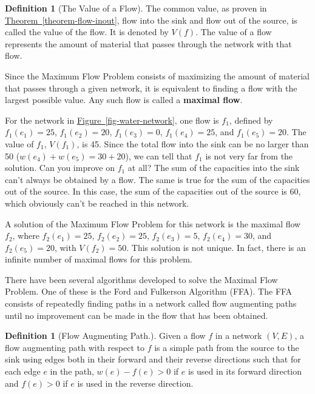 \documentclass[10pt,]{book}
\newcommand{\terminology}[1]{\textbf{#1}}
\theoremstyle{plain}
\theoremstyle{definition}
\newtheorem{definition}[theorem]{Definition}
\theoremstyle{definition}
\theoremstyle{definition}
\theoremstyle{definition}
\theoremstyle{definition}
\numberwithin{equation}{section}
\begin{document}
\begin{definition}[The Value of a Flow]\label{def-value-of-flow}
\label{notation-5}
The common value, as proven in \hyperref[theorem-flow-inout]{Theorem~\ref{theorem-flow-inout}}, flow into the sink and flow out of the source, is called the value of the flow. It is denoted by \(V(f)\). The value of a flow represents the amount of material that passes through the network with that flow.%
\end{definition}
\par
Since the Maximum Flow Problem consists of maximizing the amount of material that passes through a given network, it is equivalent to finding a flow with the largest possible value. Any such flow is called a \terminology{maximal flow}.%
\par
For the network in \hyperref[fig-water-network]{Figure~\ref{fig-water-network}}, one flow is \(f_1\), defined by \(f_1\left(e_1\right)=25\), \(f_1\left(e_2\right)=20\), \(f_1\left(e_3\right)=0\),
\(f_1\left(e_4\right)= 25\), and \(f_1\left(e_5\right)=20\). The value of \(f_1\), \(V\left(f_1\right)\), is 45. Since the total flow into the sink
can be no larger than 50 (\(w \left(e_4\right) + w \left(e_5\right) = 30 + 20\)), we can tell that \(f_1\) is not very far from the solution. Can
you improve on \(f_1\) at all? The sum of the capacities into the sink can't always be obtained by a flow. The same is true for the sum of the
capacities out of the source. In this case, the sum of the capacities out of the source is 60, which obviously can't be reached in this network.%
\par
A solution of the Maximum Flow Problem for this network is the maximal flow \(f_2\), where \(f_2\left(e_1\right)=25\), \(f_2\left(e_2\right)=25\),
\(f_2\left(e_3\right)=5\), \(f_2\left(e_4\right)= 30\), and \(f_2\left(e_5\right)=20\), with \(V\left(f_2\right) = 50\). This solution is not unique.
In fact, there is an infinite number of maximal flows for this problem.%
\par
There have been several algorithms developed to solve the Maximal Flow Problem. One of these is the Ford and Fulkerson Algorithm (FFA). The FFA consists of repeatedly finding paths in a network called flow augmenting paths until no improvement can be made in the flow that has been obtained.%
\begin{definition}[Flow Augmenting Path.]\label{def-flow-augmenting-path}
Given a flow \(f\) in a network \((V, E)\), a flow augmenting path with respect to \(f\) is a simple path from the
source to the sink using edges both in their forward and their reverse directions such that for each edge \(e\) in the path, \(w(e) - f(e) > 0\) if \(e\) is used in its forward direction and \(f(e) > 0\) if \(e\) is used in the reverse direction.
%
\end{definition}
\end{document}
